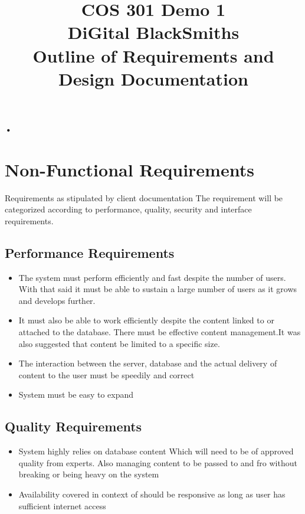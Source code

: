 \documentclass[10pt]{article}
\begin{document}
\title{COS 301 Demo 1\protect\\ DiGital BlackSmiths \protect\\ Outline of Requirements and Design Documentation
}
\maketitle

\newpage

\paragraph*{•}
\section*{Non-Functional Requirements} 

Requirements as stipulated by client documentation
The requirement will be categorized according to performance, quality, security and interface requirements.

\subsection*{Performance Requirements}
\begin{itemize}

\item The system must perform efficiently and fast despite the number of users. With that said it must be able to sustain a large number of users as it grows and develops further.
\item It must also be able to work efficiently despite the content linked to or attached to the database. There must be effective content management.{\newline \footnotesize It was also suggested that content be limited to a specific size.}
\item The interaction between the server, database and the actual delivery of content to the user must be speedily and correct
\item System must be easy to expand
\end{itemize}

\subsection*{Quality Requirements}
\begin{itemize}
\item System highly relies on database content {\newline \footnotesize Which will need to be of approved quality from experts. Also managing content to be passed to and fro without breaking or being heavy on the system}
\item Availability covered in context of should be responsive as long as user has sufficient internet access
\end{itemize}
\end{document}
